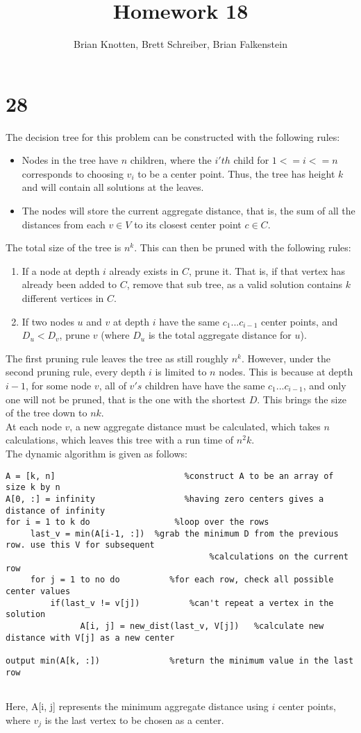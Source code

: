 \documentclass[letterpaper,notitlepage,twoside]{article}
\begin{document}
\title{Homework 18}
\author{Brian Knotten, Brett Schreiber, Brian Falkenstein}
\maketitle

\section*{28}
The decision tree for this problem can be constructed with the following rules:
\begin{itemize}
\item Nodes in the tree have $n$ children, where the $i'th$ child for $1<=i<=n$ corresponds to choosing $v_i$ to be a center point. Thus, the tree has height $k$ and will contain all solutions at the leaves.  
\item The nodes will store the current aggregate distance, that is, the sum of all the distances from each $v\in V$ to its closest center point $c\in C$. 
\end{itemize}
The total size of the tree is $n^k$. This can then be pruned with the following rules:
\begin{enumerate}
\item If a node at depth $i$ already exists in $C$, prune it. That is, if that vertex has already been added to $C$, remove that sub tree, as a valid solution contains $k$ different vertices in $C$. 
\item If two nodes $u$ and $v$ at depth $i$ have the same $c_1...c_{i-1}$ center points, and $D_u < D_v$, prune $v$ (where $D_u$ is the total aggregate distance for $u$). 
\end {enumerate}
The first pruning rule leaves the tree as still roughly $n^k$. However, under the second pruning rule, every depth $i$ is limited to $n$ nodes. This is because at depth $i-1$, for some node $v$, all of $v's$ children have have the same $c_1...c_{i-1}$, and only one will not be pruned, that is the one with the shortest $D$. This brings the size of the tree down to $nk$.\\
At each node $v$, a new aggregate distance must be calculated, which takes $n$ calculations, which leaves this tree with a run time of $n^2 k$. \\
The dynamic algorithm is given as follows:
\begin{verbatim}
A = [k, n]                          %construct A to be an array of size k by n
A[0, :] = infinity                  %having zero centers gives a distance of infinity
for i = 1 to k do                 %loop over the rows
     last_v = min(A[i-1, :])  %grab the minimum D from the previous row. use this V for subsequent
                                         %calculations on the current row
     for j = 1 to no do          %for each row, check all possible center values
         if(last_v != v[j])          %can't repeat a vertex in the solution
               A[i, j] = new_dist(last_v, V[j])   %calculate new distance with V[j] as a new center
               
output min(A[k, :])              %return the minimum value in the last row
          
\end{verbatim}
Here, A[i, j] represents the minimum aggregate distance using $i$ center points, where $v_j$ is the last vertex to be chosen as a center.
\end{document}
